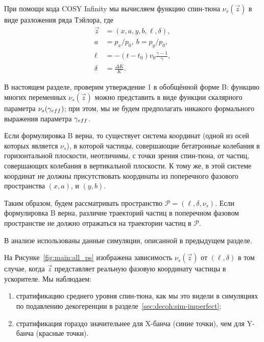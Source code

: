 \newcommand{\Ps}{\mathcal P}

При помощи кода COSY Infinity мы вычисляем функцию спин-тюна ${\nu_s(\vec z)}$ в виде
разложения ряда Тэйлора, где
\begin{align*}
  \vec z &= (x,a,y,b,\ell,\delta), \\
  a &= p_x/p_0,~ b= p_y/p_0, \\
  \ell &= -(t - t_0)v_0\frac{\gamma-1}{\gamma}, \\
  \delta &= \frac{\Delta K}{K}.
\end{align*}

В настоящем разделе, проверим утверждение 1 в обобщённой форме B: функцию многих переменных $\nu_s(\vec z)$
можно представить в виде функции скалярного параметра $\nu_s(\g*)$; при этом, мы не будем предполагать
никакого формального выражения параметра $\g*$.

Если формулировка B верна, то существует система координат (одной из осей которых является $\nu_s$),
в которой частицы, совершающие бетатронные колебания в горизонтальной плоскости, неотличимы,
с точки зрения спин-тюна, от частиц, совершающих колебания в вертикальной плоскости. К тому же, в этой системе координат не должны присутствовать координаты из поперечного
фазового пространства $(x,a)$, и $(y,b)$.

Таким образом, будем рассматривать пространство $\Ps=(\ell, \delta, \nu_s)$. Если формулировка B верна,
различие траекторий частиц в поперечном фазовом пространстве не должно отражаться на траектории частиц в $\Ps$.

В анализе использованы данные симуляции, описанной в предыдущем разделе.

На Рисунке~\ref{fig:main:all_ps} изображена зависимость $\nu_s(\vec z)$ от $(\ell, \delta)$ в том случае, когда
$\vec z$ представляет реальную фазовую координату частицы в ускорителе. Мы наблюдаем:
\begin{enumerate}
\item стратификацию среднего уровня спин-тюна, как мы это видели в симуляциях по подавлению декогеренции
  в разделе~\ref{sec:decoh:sim-imperfect};
  \item стратификация гораздо значительнее для X-банча (синие точки), чем для Y-банча (красные точки).
\end{enumerate}


